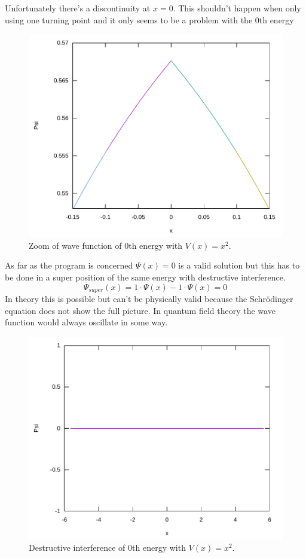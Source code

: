 \documentclass[11pt,DIV=10,final]{scrreprt} %
\begin{document}
{\begin{minipage}{\textwidth}
Unfortunately there's a discontinuity at $x = 0$. This shouldn't happen when only using one
turning point and it only seems to be a problem with the 0th energy
\begin{figure}[H]
  \centering
  \includegraphics[width=\textwidth]{plots/square-0-zoom.pdf}
  \caption{Zoom of wave function of 0th energy with $V(x) = x^{2}$.}
\end{figure}
\end{minipage}

\begin{minipage}{\textwidth}
As far as the program is concerned $\Psi(x) = 0$ is a valid solution but this has to be done
in a super position of the same energy with destructive interference.
\[
  \Psi_{super}(x) = 1 \cdot \Psi(x) - 1 \cdot \Psi(x) = 0
\]
In theory this is possible but can't be physically valid because the Schrödinger equation
does not show the full picture. In quantum field theory the wave function would always
oscillate in some way.
\begin{figure}[H]
  \centering
  \includegraphics[width=\textwidth]{plots/super-square-0-0-destructive.pdf}
  \caption{Destructive interference of 0th energy with $V(x) = x^{2}$.}
\end{figure}


\end{minipage}}
\end{document}
